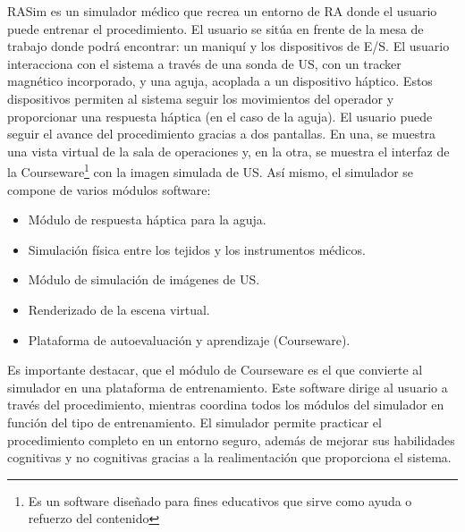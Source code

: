 %
\ac{RASim} es un simulador médico que recrea un entorno de \ac{RA} donde el usuario puede entrenar el procedimiento. El usuario se sitúa en frente de la mesa de trabajo donde podrá encontrar: un maniquí y los dispositivos de \ac{E/S}.
El usuario interacciona con el sistema a través de una sonda de \ac{US}, con un \ac{tracker} magnético incorporado, y una aguja, acoplada a un dispositivo háptico. Estos dispositivos permiten al sistema seguir los movimientos del operador y proporcionar una respuesta háptica (en el caso de la aguja).
El usuario puede seguir el avance del procedimiento gracias a dos pantallas. En una, se muestra una vista virtual de la sala de operaciones  y, en la otra, se muestra el interfaz de la \ac{Courseware}\footnote{Es un software diseñado para fines educativos que sirve como ayuda o refuerzo del contenido} con la imagen simulada de \ac{US}.
%
Así mismo, el simulador se compone de varios módulos software:
\begin{itemize}
    \item Módulo de respuesta háptica para la aguja.
    \item Simulación física entre los tejidos y los instrumentos médicos.
    \item Módulo de simulación de imágenes de \ac{US}.
    \item Renderizado de la escena virtual.
    \item Plataforma de autoevaluación y aprendizaje (\acs{Courseware}).
\end{itemize}

Es importante destacar, que el módulo de \ac{Courseware} es el que convierte al simulador en una plataforma de entrenamiento. Este software dirige al usuario a través del procedimiento, mientras coordina todos los módulos del simulador en función del tipo de entrenamiento.  
%
El simulador permite practicar el procedimiento completo en un entorno seguro, además de mejorar sus habilidades cognitivas y no cognitivas gracias a la realimentación que proporciona el sistema.

